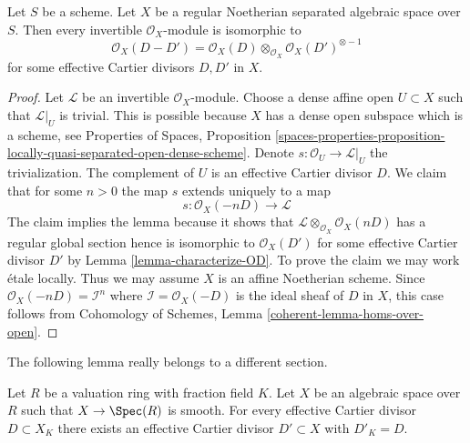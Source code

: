 \begin{lemma}
\label{lemma-Noetherian-regular-separated-pic-effective-Cartier}
Let $S$ be a scheme. Let $X$ be a regular Noetherian separated algebraic space
over $S$. Then every invertible $\mathcal{O}_X$-module is isomorphic to
$$
\mathcal{O}_X(D - D') =
\mathcal{O}_X(D) \otimes_{\mathcal{O}_X} \mathcal{O}_X(D')^{\otimes -1}
$$
for some effective Cartier divisors $D, D'$ in $X$.
\end{lemma}

\begin{proof}
Let $\mathcal{L}$ be an invertible $\mathcal{O}_X$-module.
Choose a dense affine open $U \subset X$ such that
$\mathcal{L}|_U$ is trivial. This is possible because
$X$ has a dense open subspace which is a scheme, see
Properties of Spaces, Proposition
\ref{spaces-properties-proposition-locally-quasi-separated-open-dense-scheme}.
Denote $s : \mathcal{O}_U \to \mathcal{L}|_U$ the trivialization.
The complement of $U$ is an effective Cartier divisor
$D$. We claim that for some $n > 0$ the map $s$ extends uniquely to a map
$$
s : \mathcal{O}_X(-nD) \longrightarrow \mathcal{L}
$$
The claim implies the lemma because it shows that
$\mathcal{L} \otimes_{\mathcal{O}_X} \mathcal{O}_X(nD)$
has a regular global section hence is isomorphic to
$\mathcal{O}_X(D')$ for some effective Cartier divisor $D'$
by Lemma \ref{lemma-characterize-OD}.
To prove the claim we may work \'etale locally. Thus we may assume
$X$ is an affine Noetherian scheme. Since
$\mathcal{O}_X(-nD) = \mathcal{I}^n$ where $\mathcal{I} = \mathcal{O}_X(-D)$
is the ideal sheaf of $D$ in $X$, this case follows from
Cohomology of Schemes, Lemma \ref{coherent-lemma-homs-over-open}.
\end{proof}

\noindent
The following lemma really belongs to a different section.

\begin{lemma}
\label{lemma-smooth-over-valuation-ring-effective-Cartier}
Let $R$ be a valuation ring with fraction field $K$.
Let $X$ be an algebraic space over $R$ such that $X \to \Spec(R)$
is smooth. For every effective Cartier divisor $D \subset X_K$
there exists an effective Cartier divisor $D' \subset X$
with $D'_K = D$.
\end{lemma}

